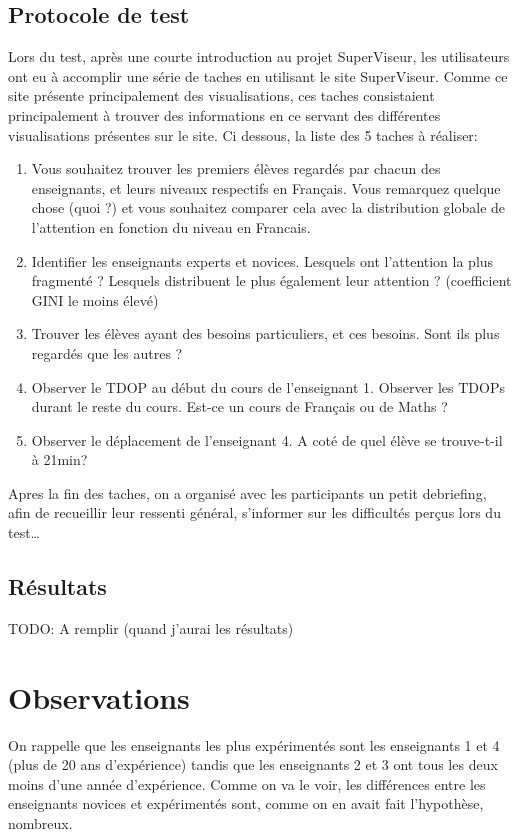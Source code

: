 \documentclass{article}
\begin{document}
\subsection{Protocole de test}
Lors du test, après une courte introduction au projet SuperViseur, les utilisateurs ont eu à accomplir une série de taches en utilisant le site SuperViseur. Comme ce site présente principalement des visualisations, ces taches consistaient principalement à trouver des informations en ce servant des différentes visualisations présentes sur le site. Ci dessous, la liste des 5 taches à réaliser:
\begin{enumerate}
    \item Vous souhaitez trouver les premiers élèves regardés par chacun des enseignants, et leurs niveaux respectifs en Français. Vous remarquez quelque chose (quoi ?) et vous souhaitez comparer cela avec la distribution globale de l'attention en fonction du niveau en Francais.
    \item Identifier les enseignants experts et novices. Lesquels ont l'attention la plus fragmenté ? Lesquels distribuent le plus également leur attention ? (coefficient GINI le moins élevé)
    \item Trouver les élèves ayant des besoins particuliers, et ces besoins. Sont ils plus regardés que les autres ?
    \item Observer le TDOP au début du cours de l'enseignant 1. Observer les TDOPs durant le reste du cours. Est-ce un cours de Français ou de Maths ?
    \item Observer le déplacement de l'enseignant 4. A coté de quel élève se trouve-t-il à 21min?
\end{enumerate}
Apres la fin des taches, on a organisé avec les participants un petit debriefing, afin de recueillir leur ressenti général, s'informer sur les difficultés perçus lors du test\ldots

\subsection{Résultats}
TODO: A remplir (quand j'aurai les résultats)

\section{Observations}
On rappelle que les enseignants les plus expérimentés sont les enseignants 1 et 4 (plus de 20 ans d'expérience) tandis que les enseignants 2 et 3 ont tous les deux moins d'une année d'expérience. Comme on va le voir, les différences entre les enseignants novices et expérimentés sont, comme on en avait fait l'hypothèse, nombreux.
\end{document}
